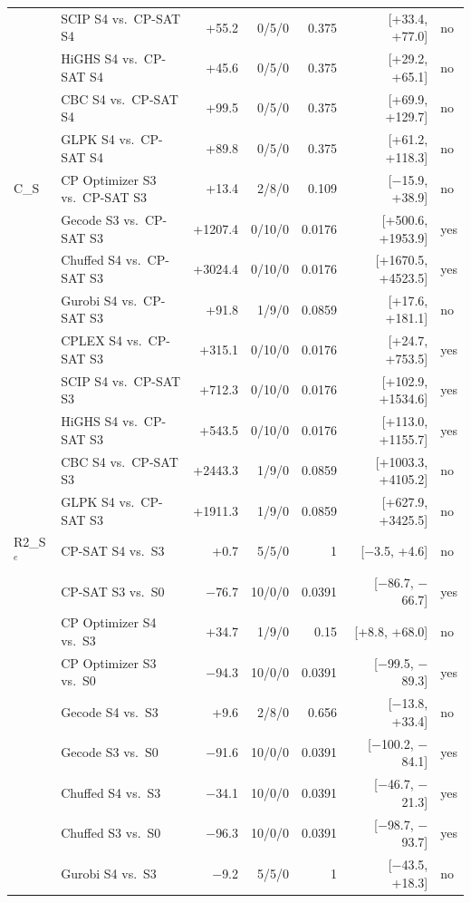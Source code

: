 \begin{longtable}{llrrrrl}
 & SCIP S4 vs.\ CP-SAT S4 & +55.2 & 0/5/0 & 0.375 & [+33.4, +77.0] & no \\
 & HiGHS S4 vs.\ CP-SAT S4 & +45.6 & 0/5/0 & 0.375 & [+29.2, +65.1] & no \\
 & CBC S4 vs.\ CP-SAT S4 & +99.5 & 0/5/0 & 0.375 & [+69.9, +129.7] & no \\
 & GLPK S4 vs.\ CP-SAT S4 & +89.8 & 0/5/0 & 0.375 & [+61.2, +118.3] & no \\
C\_S & CP Optimizer S3 vs.\ CP-SAT S3 & +13.4 & 2/8/0 & 0.109 & [$-$15.9, +38.9] & no \\
 & Gecode S3 vs.\ CP-SAT S3 & +1207.4 & 0/10/0 & 0.0176 & [+500.6, +1953.9] & yes \\
 & Chuffed S4 vs.\ CP-SAT S3 & +3024.4 & 0/10/0 & 0.0176 & [+1670.5, +4523.5] & yes \\
 & Gurobi S4 vs.\ CP-SAT S3 & +91.8 & 1/9/0 & 0.0859 & [+17.6, +181.1] & no \\
 & CPLEX S4 vs.\ CP-SAT S3 & +315.1 & 0/10/0 & 0.0176 & [+24.7, +753.5] & yes \\
 & SCIP S4 vs.\ CP-SAT S3 & +712.3 & 0/10/0 & 0.0176 & [+102.9, +1534.6] & yes \\
 & HiGHS S4 vs.\ CP-SAT S3 & +543.5 & 0/10/0 & 0.0176 & [+113.0, +1155.7] & yes \\
 & CBC S4 vs.\ CP-SAT S3 & +2443.3 & 1/9/0 & 0.0859 & [+1003.3, +4105.2] & no \\
 & GLPK S4 vs.\ CP-SAT S3 & +1911.3 & 1/9/0 & 0.0859 & [+627.9, +3425.5] & no \\
R2\_S$^{e}$ & CP-SAT S4 vs.\ S3 & +0.7 & 5/5/0 & 1 & [$-$3.5, +4.6] & no \\
 & CP-SAT S3 vs.\ S0 & $-$76.7 & 10/0/0 & 0.0391 & [$-$86.7, $-$66.7] & yes \\
 & CP Optimizer S4 vs.\ S3 & +34.7 & 1/9/0 & 0.15 & [+8.8, +68.0] & no \\
 & CP Optimizer S3 vs.\ S0 & $-$94.3 & 10/0/0 & 0.0391 & [$-$99.5, $-$89.3] & yes \\
 & Gecode S4 vs.\ S3 & +9.6 & 2/8/0 & 0.656 & [$-$13.8, +33.4] & no \\
 & Gecode S3 vs.\ S0 & $-$91.6 & 10/0/0 & 0.0391 & [$-$100.2, $-$84.1] & yes \\
 & Chuffed S4 vs.\ S3 & $-$34.1 & 10/0/0 & 0.0391 & [$-$46.7, $-$21.3] & yes \\
 & Chuffed S3 vs.\ S0 & $-$96.3 & 10/0/0 & 0.0391 & [$-$98.7, $-$93.7] & yes \\
 & Gurobi S4 vs.\ S3 & $-$9.2 & 5/5/0 & 1 & [$-$43.5, +18.3] & no \\

\end{longtable}
